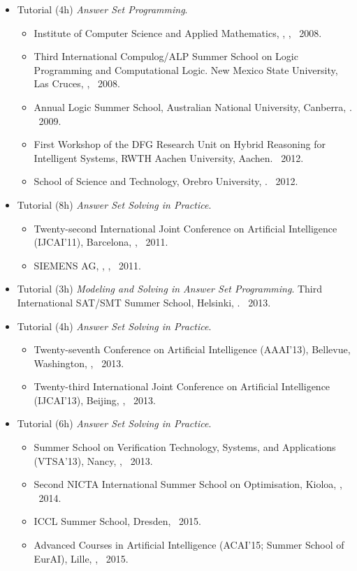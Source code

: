 \documentclass{article}
\begin{document}
\begin{itemize}

\item Tutorial (4h)
  \emph{Answer Set Programming}.
  \begin{itemize}
  \item Institute of Computer Science and Applied Mathematics,
    ,
    \SWITZERLAND,
    \FEB\ 2008.
  \item Third International Compulog/ALP Summer School on Logic Programming and Computational Logic.
    New Mexico State University,
    Las Cruces, \USA,
    \JUL\ 2008.
  \item Annual Logic Summer School,
    Australian National University,
    Canberra, \AUSTRALIA.
    \DEC\ 2009.
  \item First Workshop of the DFG Research Unit on Hybrid Reasoning for Intelligent Systems,
    RWTH Aachen University, Aachen\xGERMANY.
    \NOV\ 2012.
  \item School of Science and Technology,
    Orebro University, \SWEDEN.
    \NOV\ 2012.
  \end{itemize}

\item Tutorial (8h)
  \emph{Answer Set Solving in Practice}.
  \begin{itemize}
  \item Twenty-second International Joint Conference on Artificial Intelligence (IJCAI'11),
    Barcelona, \SPAIN,
    \JUL\ 2011.
  \item SIEMENS AG,
    \VIENNA, \AUSTRIA,
    \SEP\ 2011.
  \end{itemize}

\item Tutorial (3h)
  \emph{Modeling and Solving in Answer Set Programming}.
  Third International SAT/SMT Summer School,
  Helsinki, \FINLAND.
  \JUL\ 2013.

\item Tutorial (4h)
  \emph{Answer Set Solving in Practice}.
  \begin{itemize}
  \item Twenty-seventh Conference on Artificial Intelligence (AAAI'13),
    Bellevue, Washington, \USA,
    \JUL\ 2013.
  \item Twenty-third International Joint Conference on Artificial Intelligence (IJCAI'13),
    Beijing, \CHINA,
    \AUG\ 2013.
  \end{itemize}

\item Tutorial (6h)
  \emph{Answer Set Solving in Practice}.
  \begin{itemize}
  \item Summer School on Verification Technology, Systems, and Applications (VTSA'13),
    Nancy, \FRANCE,
    \SEP\ 2013.
  \item Second NICTA International Summer School on Optimisation,
    Kioloa, \AUSTRALIA,
    \JAN\ 2014.
  \item ICCL Summer School,
    Dresden\xGERMANY,
    \SEP\ 2015.
  \item Advanced Courses in Artificial Intelligence (ACAI’15; Summer School of EurAI),
    Lille, \FRANCE,
    \OCT\ 2015.
  \end{itemize}


\end{itemize}
\end{document}
